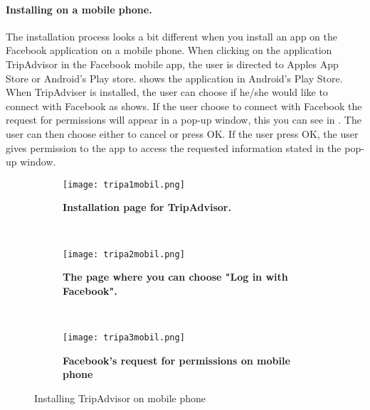 \paragraph{Installing on a mobile phone.}
The installation process looks a bit different when you install an app on the Facebook application on a mobile phone. When clicking on the application TripAdvisor in the Facebook mobile app, the user is directed to Apples App Store or Android's Play store.  shows the application in Android's Play Store. When TripAdviser is installed, the user can choose if he/she would like to connect with Facebook as  shows. If the user choose to connect with Facebook the request for permissions will appear in a pop-up window, this you can see in . The user can then choose either to cancel or press OK. If the user press OK, the user gives permission to the app to access the requested information stated in the pop-up window. 

\begin{figure}
        \centering
        \begin{subfigure}[t]{0.3\textwidth}
                \texttt{[image: tripa1mobil.png]}
                \caption[Installation page for TripAdvisor]{\textbf{Installation 				page for TripAdvisor.}} 
                \label{fig:tripa1mobil}
        \end{subfigure}%
        ~ %
        \begin{subfigure}[t]{0.3\textwidth}
                \texttt{[image: tripa2mobil.png]}
               \caption[The page where you choose "Log in with Facebook"]							{\textbf{The page where you can choose "Log in with Facebook".}} 
                \label{fig:tripa2mobil}
        \end{subfigure}
        ~ %
        \begin{subfigure}[t]{0.3\textwidth}
                \texttt{[image: tripa3mobil.png]}
                \caption[Facebook's request for permissions on mobile phone]						{\textbf{Facebook's request for permissions on mobile phone}} 
                \label{fig:tripa3mobil}
        \end{subfigure}
        \caption{Installing TripAdvisor on mobile phone}\label{fig:mobileinstallation}
\end{figure}

